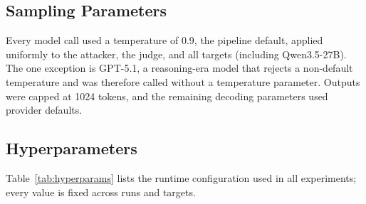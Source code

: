 \documentclass[11pt]{article}
\begin{document}
\subsection{Sampling Parameters}
Every model call used a temperature of 0.9, the pipeline default, applied uniformly to the attacker, the judge, and all targets (including Qwen3.5-27B). The one exception is GPT-5.1, a reasoning-era model that rejects a non-default temperature and was therefore called without a temperature parameter. Outputs were capped at 1024 tokens, and the remaining decoding parameters used provider defaults.

\subsection{Hyperparameters}
Table~\ref{tab:hyperparams} lists the runtime configuration used in all experiments; every value is fixed across runs and targets.
\end{document}

